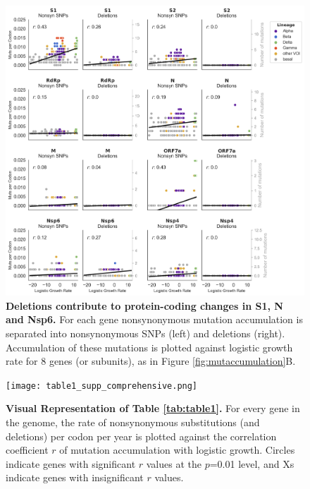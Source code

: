 \documentclass[11pt,oneside,letterpaper]{article}
\begin{document}
\begin{figure}[h!]
\centerline{\includegraphics[scale=0.5]{fig1_supp_snpdel.png}}
\caption{\textbf{Deletions contribute to protein-coding changes in S1, N and Nsp6.}
For each gene nonsynonymous mutation accumulation is separated into nonsynonymous SNPs (left) and deletions (right). Accumulation of these mutations is plotted against logistic growth rate for 8 genes (or subunits), as in Figure \ref{fig:mutaccumulation}B.
}
\label{fig:snpdel}
\end{figure}

\begin{figure}[h!]
\centerline{\texttt{[image: table1\_supp\_comprehensive.png]}}
\caption{\textbf{Visual Representation of Table \ref{tab:table1}.}
For every gene in the genome, the rate of nonsynonymous substitutions (and deletions) per codon per year is plotted against the correlation coefficient $r$ of mutation accumulation with logistic growth. Circles indicate genes with significant $r$ values at the $p$=0.01 level, and Xs indicate genes with insignificant $r$ values.
}
\label{fig:correlationcomprehensive}
\end{figure}
\end{document}
